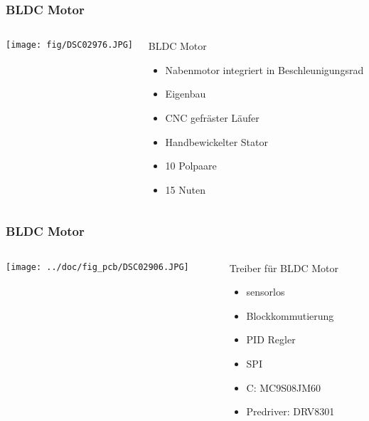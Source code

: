\begin{frame}
    \frametitle{BLDC Motor}
    \begin{columns}
        \begin{column}{0.50\textwidth}
            \centering
            \texttt{[image: fig/DSC02976.JPG]}
        \end{column}
        \begin{column}{0.50\textwidth}
            \begin{block}{BLDC Motor}
                \begin{itemize}
                    \item Nabenmotor integriert in Beschleunigungsrad
                    \item Eigenbau
                    \item CNC gefräster Läufer
                    \item Handbewickelter Stator
                    \item 10 Polpaare
                    \item 15 Nuten
                \end{itemize}
            \end{block}
        \end{column}
    \end{columns}
\end{frame}
\begin{frame}
    \frametitle{BLDC Motor}
    \begin{columns}
        \begin{column}{0.50\textwidth}
            \centering
            \texttt{[image: ../doc/fig\_pcb/DSC02906.JPG]}
        \end{column}
        \begin{column}{0.50\textwidth}
            \begin{block}{Treiber für BLDC Motor}
                \begin{itemize}
                    \item sensorlos
                    \item Blockkommutierung
                    \item PID Regler
                    \item SPI
                    \item \si{\micro}C: MC9S08JM60
                    \item Predriver: DRV8301
                \end{itemize}
            \end{block}
        \end{column}
    \end{columns}
\end{frame}
